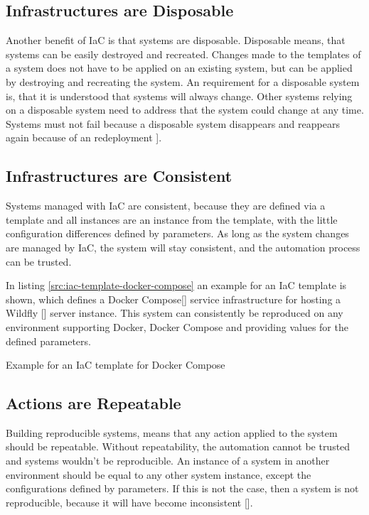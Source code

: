 \subsection{Infrastructures are Disposable}
\label{sec:iac-principles-disposable}
Another benefit of IaC is that systems are disposable. Disposable means, that systems can be easily destroyed and recreated. Changes made to the templates of a system does not have to be applied on an existing system, but can be applied by destroying and recreating the system. An requirement for a disposable system is, that it is understood that systems will always change. Other systems relying on a disposable system need to address that the system could change at any time. Systems must not fail because a disposable system disappears and reappears again because of an redeployment \cite[p. 11]{Morris2016}].

\subsection{Infrastructures are Consistent}
\label{sec:iac-principles-consistency}
Systems managed with IaC are consistent, because they are defined via a template and all instances are an instance from the template, with the little configuration differences defined by parameters. As long as the system changes are managed by IaC, the system will stay consistent, and the automation process can be trusted.  

In listing \ref{src:iac-template-docker-compose} an example for an IaC template is shown, which defines a Docker Compose[\cite{DockerCompose2018}] service infrastructure for hosting a Wildfly [\cite{Wildfly2017}] server instance. This system can consistently be reproduced on any environment supporting Docker, Docker Compose and providing values for the defined parameters.
\begin{code}
	\caption{Example for an IaC template for Docker Compose}
	\label{src:iac-template-docker-compose}
\end{code}

\subsection{Actions are Repeatable}
\label{sec:iac-principles-repeatability}
Building reproducible systems, means that any action applied to the system should be repeatable. Without repeatability, the automation cannot be trusted and systems wouldn't be reproducible. An instance of a system in another environment should be equal to any other system instance, except the configurations defined by parameters. If this is not the case, then a system is not reproducible, because it will have become inconsistent [\cite[p. 12 -13]{Morris2016}].

